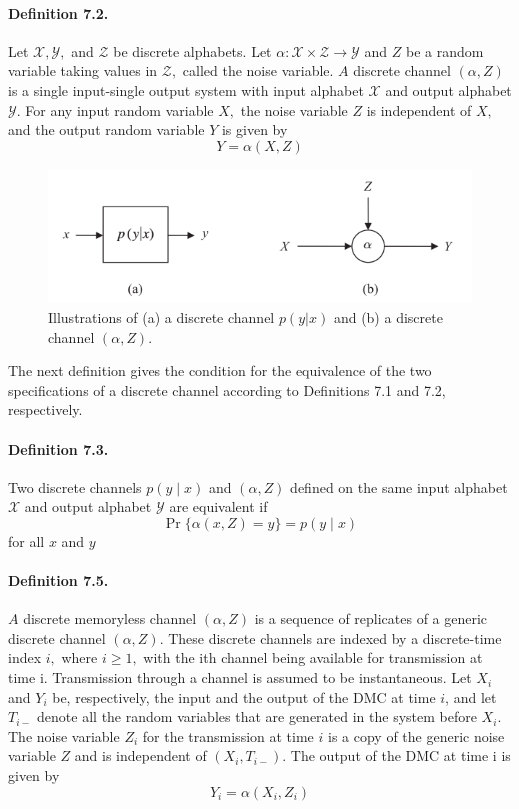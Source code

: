 \documentclass[8pt]{article}
\begin{document}
\begin{tcolorbox}
	\paragraph{Definition 7.2.} Let $\mathcal{X}, \mathcal{Y},$ and $\mathcal{Z}$ be discrete alphabets. Let $\alpha: \mathcal{X} \times \mathcal{Z} \rightarrow \mathcal{Y}$
	and $Z$ be a random variable taking values in $\mathcal{Z},$ called the noise variable. $A$ discrete channel $(\alpha, Z)$ is a single input-single output system with input alphabet $\mathcal{X}$ and output alphabet $\mathcal{Y}$. For any input random variable $X,$ the noise variable $Z$ is independent of $X,$ and the output random variable $Y$ is given by
	$$
	Y=\alpha(X, Z)
	$$
\end{tcolorbox}
\begin{figure}[!h]
	\centering
	\includegraphics[width=0.5\linewidth]{imgs/exp7_2.png}
	\caption{Illustrations of (a) a discrete channel $p(y|x)$ and (b) a discrete channel $(\alpha, Z)$.}
	\label{fig:my_label}
\end{figure}
The next definition gives the condition for the equivalence of the two specifications of a discrete channel according to Definitions 7.1 and 7.2, respectively.

\begin{tcolorbox}
	\paragraph{Definition 7.3.} Two discrete channels $p(y \mid x)$ and $(\alpha, Z)$ defined on the same input alphabet $\mathcal{X}$ and output alphabet $\mathcal{Y}$ are equivalent if
	$$
	\operatorname{Pr}\{\alpha(x, Z)=y\}=p(y \mid x)
	$$
	for all $x$ and $y$
\end{tcolorbox}

\begin{tcolorbox}
	\paragraph{Definition 7.5.} $A$ discrete memoryless channel $(\alpha, Z)$ is a sequence of replicates of a generic discrete channel $(\alpha, Z) .$ These discrete channels are indexed by a discrete-time index $i,$ where $i \geq 1,$ with the ith channel being available for transmission at time i. Transmission through a channel is assumed to be instantaneous. Let $X_{i}$ and $Y_{i}$ be, respectively, the input and the output of the DMC at time $i$, and let $T_{i-}$ denote all the random variables that are generated in the system before $X_{i} .$ The noise variable $Z_{i}$ for the transmission at time $i$ is a copy of the generic noise variable $Z$ and is independent of $\left(X_{i}, T_{i-}\right) .$ The
	output of the DMC at time i is given by
	$$
	Y_{i}=\alpha\left(X_{i}, Z_{i}\right)
	$$
\end{tcolorbox}
\end{document}
